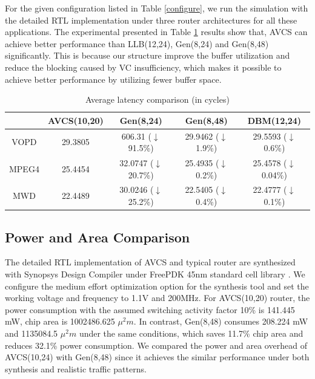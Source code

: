 \documentclass[10pt,conference]{IEEEtran}
\begin{document}
For the given configuration listed in Table \ref{configure}, we run the simulation with the detailed RTL implementation under three router architectures for all these applications. The experimental presented in Table \ref{realisticapp} results show that, AVCS can achieve better performance than LLB(12,24), Gen(8,24) and Gen(8,48) significantly. This is because our structure improve the buffer utilization and reduce the blocking caused by VC insufficiency, which makes it possible to achieve better performance by utilizing fewer buffer space.
\begin{table}
  \centering\caption{Average latency comparison (in cycles)}\label{realisticapp}
\begin{tabular}{|c|c|c|c|c|}
\hline
 & AVCS(10,20) & Gen(8,24) & Gen(8,48) & DBM(12,24)\\
\hline\hline
VOPD & 29.3805 & 606.31 ($\downarrow$ 91.5\%) & 29.9462 ($\downarrow$ 1.9\%) & 29.5593 ($\downarrow$ 0.6\%)\\
\hline
MPEG4 & 25.4454 & 32.0747 ($\downarrow$ 20.7\%) & 25.4935 ($\downarrow$ 0.2\%) & 25.4578 ($\downarrow$ 0.04\%)\\
\hline
MWD & 22.4489 & 30.0246 ($\downarrow$ 25.2\%) & 22.5405 ($\downarrow$ 0.4\%) & 22.4777 ($\downarrow$ 0.1\%)\\
\hline
\end{tabular}
\end{table}

\subsection{Power and Area Comparison}\label{area}
The detailed RTL implementation of AVCS and typical router are synthesized with Synopsys Design Compiler under FreePDK 45nm standard cell library \cite{nangate}. We configure the medium effort optimization option for the synthesis tool and set the working voltage and frequency to 1.1V and 200MHz. For AVCS(10,20) router, the power consumption with the assumed switching activity factor 10\% is 141.445 mW, chip area is 1002486.625 $\mu^2 m$. In contrast, Gen(8,48) consumes 208.224 mW and 1135084.5 $\mu^2 m$ under the same conditions, which saves 11.7\% chip area and reduces 32.1\% power consumption. We compared the power and area overhead of AVCS(10,24) with Gen(8,48) since it achieves the similar performance under both synthesis and realistic traffic patterns.

\end{document}
